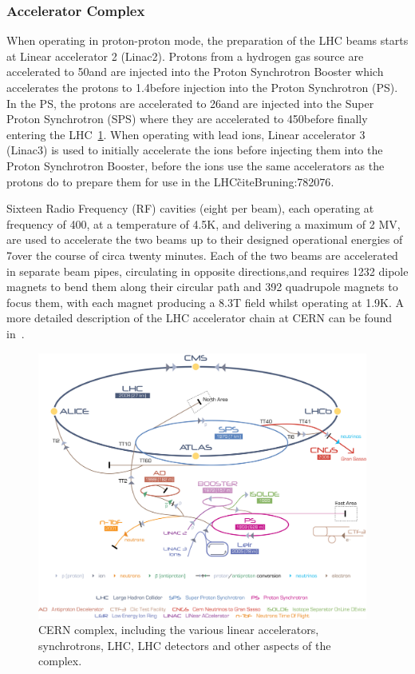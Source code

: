 \subsubsection{Accelerator Complex}
When operating in proton-proton mode, the preparation of the LHC beams starts at Linear accelerator 2 (Linac2). 
Protons from a hydrogen gas source are accelerated to 50\MeV and are injected into the Proton Synchrotron Booster which accelerates the protons to 1.4\GeV before injection into the Proton Synchrotron (PS). 
In the PS, the protons are accelerated to 26\GeV and are injected into the Super Proton Synchrotron (SPS) where they are accelerated to 450\GeV before finally entering the LHC~\ref{fig:cern-accelerator-complex}. 
When operating with lead ions, Linear accelerator 3 (Linac3) is used to initially accelerate the ions before injecting them into the Proton Synchrotron Booster, before the ions use the same accelerators as the protons do to prepare them for use in the LHC\~cite{Bruning:782076}. 

Sixteen Radio Frequency (RF) cavities (eight per beam), each operating at frequency of 400\MHz, at a temperature of 4.5K, and delivering a maximum of 2 MV, are used to accelerate the two beams up to their designed operational energies of 7\TeV over the course of circa twenty minutes.
Each of the two beams are accelerated in separate beam pipes, circulating in opposite directions,and requires 1232 dipole magnets to bend them along their circular path and 392 quadrupole magnets to focus them, with each magnet producing a 8.3T field whilst operating at 1.9K.
A more detailed description of the LHC accelerator chain at CERN can be found in~\cite{Schindl:397574}. 

\begin{figure}[htbp]
\begin{center}
\includegraphics[width=0.97\textwidth]{figs/lhc/Cern-Accelerator-Complex.jpg}
\caption{CERN complex, including the various linear accelerators, synchrotrons, LHC, LHC detectors and other aspects of the complex.}
\label{fig:cern-accelerator-complex}
\end{center}
\end{figure}

